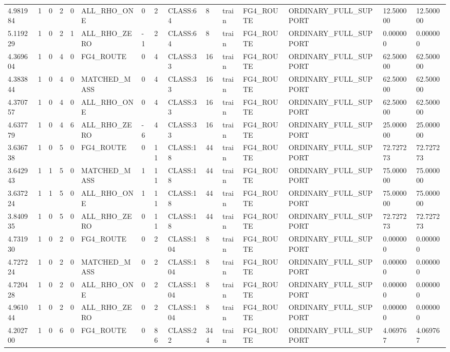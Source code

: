 \begin{tabular}{lllllllllllllll}
4.981984 & 1 & 0 & 2 & 0 & ALL\_RHO\_ONE & 0 & 2 & CLASS:64 & 8 & train & FG4\_ROUTE & ORDINARY\_FULL\_SUPPORT & 12.500000 & 12.500000 \\
5.119229 & 1 & 0 & 2 & 1 & ALL\_RHO\_ZERO & -1 & 2 & CLASS:64 & 8 & train & FG4\_ROUTE & ORDINARY\_FULL\_SUPPORT & 0.000000 & 0.000000 \\
4.369604 & 1 & 0 & 4 & 0 & FG4\_ROUTE & 0 & 4 & CLASS:33 & 16 & train & FG4\_ROUTE & ORDINARY\_FULL\_SUPPORT & 62.500000 & 62.500000 \\
4.383844 & 1 & 0 & 4 & 0 & MATCHED\_MASS & 0 & 4 & CLASS:33 & 16 & train & FG4\_ROUTE & ORDINARY\_FULL\_SUPPORT & 62.500000 & 62.500000 \\
4.370757 & 1 & 0 & 4 & 0 & ALL\_RHO\_ONE & 0 & 4 & CLASS:33 & 16 & train & FG4\_ROUTE & ORDINARY\_FULL\_SUPPORT & 62.500000 & 62.500000 \\
4.637779 & 1 & 0 & 4 & 6 & ALL\_RHO\_ZERO & -6 & 4 & CLASS:33 & 16 & train & FG4\_ROUTE & ORDINARY\_FULL\_SUPPORT & 25.000000 & 25.000000 \\
3.636738 & 1 & 0 & 5 & 0 & FG4\_ROUTE & 0 & 11 & CLASS:18 & 44 & train & FG4\_ROUTE & ORDINARY\_FULL\_SUPPORT & 72.727273 & 72.727273 \\
3.642943 & 1 & 1 & 5 & 0 & MATCHED\_MASS & 1 & 11 & CLASS:18 & 44 & train & FG4\_ROUTE & ORDINARY\_FULL\_SUPPORT & 75.000000 & 75.000000 \\
3.637224 & 1 & 1 & 5 & 0 & ALL\_RHO\_ONE & 1 & 11 & CLASS:18 & 44 & train & FG4\_ROUTE & ORDINARY\_FULL\_SUPPORT & 75.000000 & 75.000000 \\
3.840935 & 1 & 0 & 5 & 0 & ALL\_RHO\_ZERO & 0 & 11 & CLASS:18 & 44 & train & FG4\_ROUTE & ORDINARY\_FULL\_SUPPORT & 72.727273 & 72.727273 \\
4.731930 & 1 & 0 & 2 & 0 & FG4\_ROUTE & 0 & 2 & CLASS:104 & 8 & train & FG4\_ROUTE & ORDINARY\_FULL\_SUPPORT & 0.000000 & 0.000000 \\
4.727224 & 1 & 0 & 2 & 0 & MATCHED\_MASS & 0 & 2 & CLASS:104 & 8 & train & FG4\_ROUTE & ORDINARY\_FULL\_SUPPORT & 0.000000 & 0.000000 \\
4.720428 & 1 & 0 & 2 & 0 & ALL\_RHO\_ONE & 0 & 2 & CLASS:104 & 8 & train & FG4\_ROUTE & ORDINARY\_FULL\_SUPPORT & 0.000000 & 0.000000 \\
4.961044 & 1 & 0 & 2 & 0 & ALL\_RHO\_ZERO & 0 & 2 & CLASS:104 & 8 & train & FG4\_ROUTE & ORDINARY\_FULL\_SUPPORT & 0.000000 & 0.000000 \\
4.202700 & 1 & 0 & 6 & 0 & FG4\_ROUTE & 0 & 86 & CLASS:22 & 344 & train & FG4\_ROUTE & ORDINARY\_FULL\_SUPPORT & 4.069767 & 4.069767 \\

\end{tabular}

